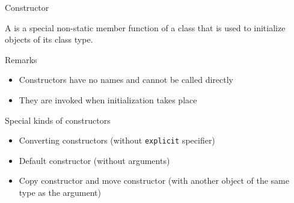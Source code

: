 \begin{frame}{Constructor}{}
  \begin{definition}[Constructor]
    A  is a special non-static member function of a class that is used to initialize objects of its class type.
  \end{definition}

  \begin{block}{Remarks}
    \begin{itemize}
    \item
      Constructors have no names and cannot be called directly
    \item
      They are invoked when initialization takes place
    \end{itemize}
  \end{block}

  \begin{block}{Special kinds of constructors}
    \begin{itemize}
    \item
      Converting constructors (without \lstinline!explicit! specifier)
    \item
      Default constructor (without arguments)
    \item
      Copy constructor and move constructor (with another object of the same type as the argument)
    \end{itemize}
  \end{block}
\end{frame}

